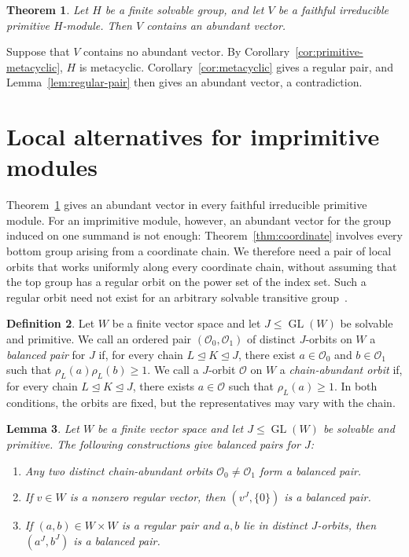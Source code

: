 \documentclass[10pt]{amsart}
\newtheorem{theorem}{Theorem}[section]
\newtheorem{lemma}[theorem]{Lemma}
\theoremstyle{definition}
\newtheorem{definition}[theorem]{Definition}
\renewcommand{\ge}{\geqslant}
\renewcommand{\leq}{\leqslant}
\let\oldendproof\endproof
\renewenvironment{proof}[1][\proofname]{%
  \oldproof[\bfseries #1]%
}{\oldendproof}
\newcommand{\orbit}{\mathcal{O}}
\DeclareMathOperator{\GL}{GL}
\numberwithin{equation}{section}
\numberwithin{table}{section}
\begin{document}
\begin{theorem}\label{thm:primitive-action}
Let $H$ be a finite solvable group, and let $V$ be a faithful irreducible
primitive $H$-module. Then $V$ contains an abundant vector.
\end{theorem}

\begin{proof}
Suppose that $V$ contains no abundant vector. By
Corollary~\ref{cor:primitive-metacyclic}, $H$ is metacyclic.
Corollary~\ref{cor:metacyclic} gives a regular pair, and
Lemma~\ref{lem:regular-pair} then gives an abundant vector, a contradiction.
\end{proof}

\section{Local alternatives for imprimitive modules}
\label{sec:local-alternatives}

Theorem~\ref{thm:primitive-action} gives an abundant vector in every
faithful irreducible primitive module. For an imprimitive module, however,
an abundant vector for the group induced on one
summand is not enough: Theorem~\ref{thm:coordinate} involves every bottom
group arising from a coordinate chain. We therefore need a pair of local
orbits that works uniformly along every coordinate chain, without assuming
that the top group has a regular orbit on the power set of the index set. Such
a regular orbit need not exist for an arbitrary solvable transitive
group~\cite{Glu25}.

\begin{definition}\label{def:balanced-pair}\label{def:chain-label-linear}
Let $W$ be a finite vector space and let $J\leq\GL(W)$ be solvable and
primitive. We call an ordered pair $(\orbit_0,\orbit_1)$ of distinct
$J$-orbits on $W$ a {\it balanced pair} for $J$ if, for every chain
$L\trianglelefteq K\trianglelefteq J$, there exist $a\in\orbit_0$ and
$b\in\orbit_1$ such that $\rho_L(a)\rho_L(b)\ge1$. We call a $J$-orbit
$\orbit$ on $W$ a {\it chain-abundant orbit} if, for every chain
$L\trianglelefteq K\trianglelefteq J$, there exists $a\in\orbit$ such that
$\rho_L(a)\ge1$. In both conditions, the orbits are fixed, but the
representatives may vary with the chain.
\end{definition}

\begin{lemma}\label{lem:balanced-sources}
Let $W$ be a finite vector space and let $J\leq\GL(W)$ be solvable and
primitive. The following constructions give balanced pairs for $J$:
\begin{enumerate}
\item Any two distinct chain-abundant orbits $\orbit_0\ne\orbit_1$ form a
balanced pair.
\item If $v\in W$ is a nonzero regular vector, then $(v^J,\{0\})$ is a
balanced pair.
\item If $(a,b)\in W\times W$ is a regular pair and $a,b$ lie in distinct
$J$-orbits, then $(a^J,b^J)$ is a balanced pair.
\end{enumerate}
\end{lemma}
\end{document}
